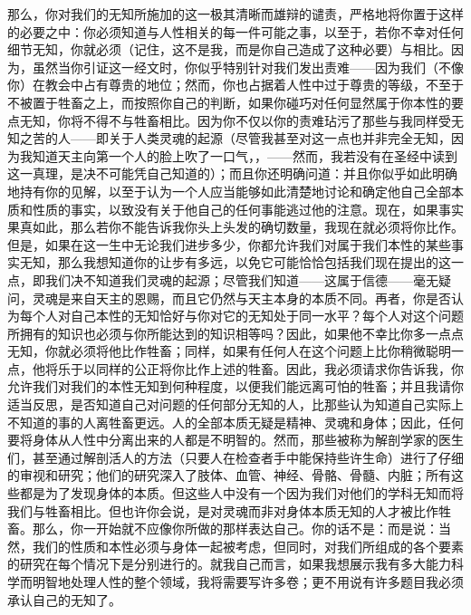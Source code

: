 那么，你对我们的无知所施加的这一极其清晰而雄辩的谴责，严格地将你置于这样的必要之中：你必须知道与人性相关的每一件可能之事，以至于，若你不幸对任何细节无知，你就必须（记住，这不是我，而是你自己造成了这种必要）与相比。因为，虽然当你引证这一经文时，你似乎特别针对我们发出责难——因为我们（不像你）在教会中占有尊贵的地位；然而，你也占据着人性中过于尊贵的等级，不至于不被置于牲畜之上，而按照你自己的判断，如果你碰巧对任何显然属于你本性的要点无知，你将不得不与牲畜相比。因为你不仅以你的责难玷污了那些与我同样受无知之苦的人——即关于人类灵魂的起源（尽管我甚至对这一点也并非完全无知，因为我知道天主向第一个人的脸上吹了一口气，，——然而，我若没有在圣经中读到这一真理，是决不可能凭自己知道的）；而且你还明确问道：并且你似乎如此明确地持有你的见解，以至于认为一个人应当能够如此清楚地讨论和确定他自己全部本质和性质的事实，以致没有关于他自己的任何事能逃过他的注意。现在，如果事实果真如此，那么若你不能告诉我你头上头发的确切数量，我现在就必须将你比作。但是，如果在这一生中无论我们进步多少，你都允许我们对属于我们本性的某些事实无知，那么我想知道你的让步有多远，以免它可能恰恰包括我们现在提出的这一点，即我们决不知道我们灵魂的起源；尽管我们知道——这属于信德——毫无疑问，灵魂是来自天主的恩赐，而且它仍然与天主本身的本质不同。再者，你是否认为每个人对自己本性的无知恰好与你对它的无知处于同一水平？每个人对这个问题所拥有的知识也必须与你所能达到的知识相等吗？因此，如果他不幸比你多一点点无知，你就必须将他比作牲畜；同样，如果有任何人在这个问题上比你稍微聪明一点，他将乐于以同样的公正将你比作上述的牲畜。因此，我必须请求你告诉我，你允许我们对我们的本性无知到何种程度，以便我们能远离可怕的牲畜；并且我请你适当反思，是否知道自己对问题的任何部分无知的人，比那些认为知道自己实际上不知道的事的人离牲畜更远。人的全部本质无疑是精神、灵魂和身体；因此，任何要将身体从人性中分离出来的人都是不明智的。然而，那些被称为解剖学家的医生们，甚至通过解剖活人的方法（只要人在检查者手中能保持些许生命）进行了仔细的审视和研究；他们的研究深入了肢体、血管、神经、骨骼、骨髓、内脏；所有这些都是为了发现身体的本质。但这些人中没有一个因为我们对他们的学科无知而将我们与牲畜相比。但也许你会说，是对灵魂而非对身体本质无知的人才被比作牲畜。那么，你一开始就不应像你所做的那样表达自己。你的话不是：而是说：当然，我们的性质和本性必须与身体一起被考虑，但同时，对我们所组成的各个要素的研究在每个情况下是分别进行的。就我自己而言，如果我想展示我有多大能力科学而明智地处理人性的整个领域，我将需要写许多卷；更不用说有许多题目我必须承认自己的无知了。\par

